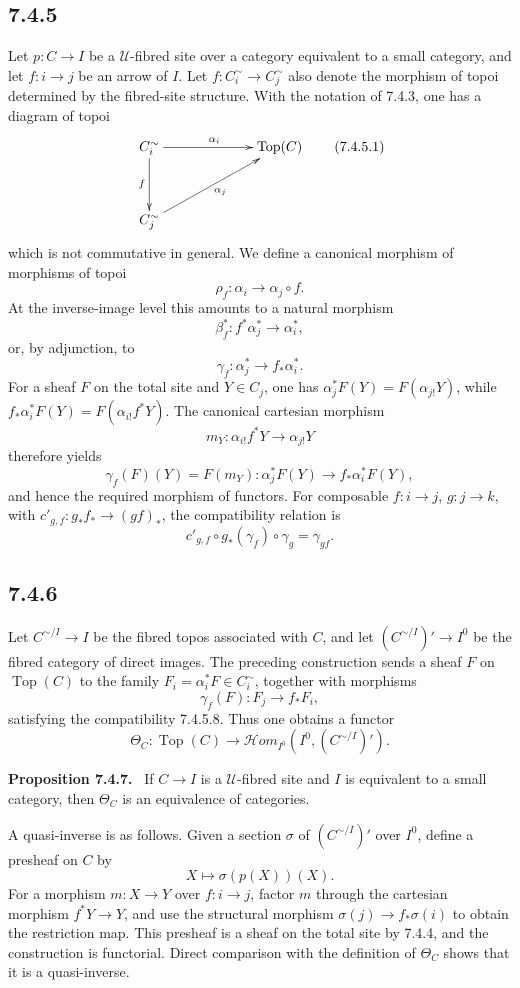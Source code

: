 \documentclass[11pt]{article}
\newcommand{\U}{\mathcal{U}}
\newcommand{\Top}{\operatorname{Top}}
\newenvironment{statement}[1]{\par\medskip\noindent\textbf{#1.}\ }{\par\medskip}
\begin{document}
\subsection*{7.4.5}
Let \(p:C\to I\) be a \(\U\)-fibred site over a category equivalent to a small category, and let \(f:i\to j\) be an arrow of \(I\). Let \(f:C_i^{\sim}\to C_j^{\sim}\) also denote the morphism of topoi determined by the fibred-site structure. With the notation of 7.4.3, one has a diagram of topoi
\[
\xymatrix@C=2.25cm@R=1.25cm{
C_i^{\sim}\ar[d]_f\ar[r]^{\alpha_i}&\Top(C)\\
C_j^{\sim}\ar[ru]_{\alpha_j}&
}\tag{7.4.5.1}
\]
which is not commutative in general. We define a canonical morphism of morphisms of topoi
\[
 \rho_f:\alpha_i\to\alpha_j\circ f. \tag{7.4.5.2}
\]
At the inverse-image level this amounts to a natural morphism
\[
 \beta_f^*:f^*\alpha_j^*\to\alpha_i^*, \tag{7.4.5.3}
\]
or, by adjunction, to
\[
 \gamma_f:\alpha_j^*\to f_*\alpha_i^*. \tag{7.4.5.4}
\]
For a sheaf \(F\) on the total site and \(Y\in C_j\), one has \(\alpha_j^*F(Y)=F(\alpha_{j!}Y)\), while \(f_*\alpha_i^*F(Y)=F(\alpha_{i!}f^*Y)\). The canonical cartesian morphism
\[
 m_Y:\alpha_{i!}f^*Y\to\alpha_{j!}Y \tag{7.4.5.5}
\]
therefore yields
\[
 \gamma_f(F)(Y)=F(m_Y):\alpha_j^*F(Y)\to f_*\alpha_i^*F(Y), \tag{7.4.5.6}
\]
and hence the required morphism of functors. For composable \(f:i\to j\), \(g:j\to k\), with \(c'_{g,f}:g_*f_*\to(gf)_*\), the compatibility relation is
\[
 c'_{g,f}\circ g_*(\gamma_f)\circ\gamma_g=\gamma_{gf}. \tag{7.4.5.8}
\]

\subsection*{7.4.6}
Let \(C^{\sim/I}\to I\) be the fibred topos associated with \(C\), and let \((C^{\sim/I})'\to I^0\) be the fibred category of direct images. The preceding construction sends a sheaf \(F\) on \(\Top(C)\) to the family \(F_i=\alpha_i^*F\in C_i^{\sim}\), together with morphisms
\[
 \gamma_f(F):F_j\to f_*F_i,
\]
satisfying the compatibility 7.4.5.8. Thus one obtains a functor
\[
 \Theta_C:\Top(C)\to\mathcal{H}om_{I^0}(I^0,(C^{\sim/I})'). \tag{7.4.6.1}
\]

\begin{statement}{Proposition 7.4.7}
If \(C\to I\) is a \(\U\)-fibred site and \(I\) is equivalent to a small category, then \(\Theta_C\) is an equivalence of categories.
\end{statement}

A quasi-inverse is as follows. Given a section \(\sigma\) of \((C^{\sim/I})'\) over \(I^0\), define a presheaf on \(C\) by
\[
 X\longmapsto \sigma(p(X))(X).
\]
For a morphism \(m:X\to Y\) over \(f:i\to j\), factor \(m\) through the cartesian morphism \(f^*Y\to Y\), and use the structural morphism \(\sigma(j)\to f_*\sigma(i)\) to obtain the restriction map. This presheaf is a sheaf on the total site by 7.4.4, and the construction is functorial. Direct comparison with the definition of \(\Theta_C\) shows that it is a quasi-inverse.
\end{document}

